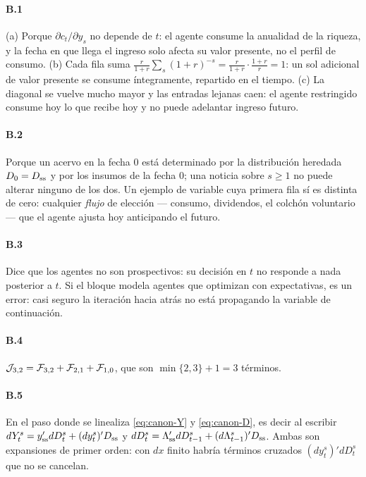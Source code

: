 \paragraph{B.1} (a) Porque $\partial c_t/\partial y_s$ no depende de $t$: el
agente consume la anualidad de la riqueza, y la fecha en que llega el ingreso solo
afecta su valor presente, no el perfil de consumo. (b) Cada fila suma
$\frac{r}{1+r}\sum_s (1+r)^{-s} = \frac{r}{1+r}\cdot\frac{1+r}{r} = 1$: un sol
adicional de valor presente se consume íntegramente, repartido en el tiempo.
(c) La diagonal se vuelve mucho mayor y las entradas lejanas caen: el agente
restringido consume hoy lo que recibe hoy y no puede adelantar ingreso futuro.

\paragraph{B.2} Porque un acervo en la fecha $0$ está determinado por la
distribución heredada $D_0=D_{\mathrm{ss}}$ y por los insumos de la fecha $0$; una noticia
sobre $s\ge1$ no puede alterar ninguno de los dos. Un ejemplo de variable cuya
primera fila sí es distinta de cero: cualquier \emph{flujo} de elección ---
consumo, dividendos, el colchón voluntario --- que el agente ajusta hoy
anticipando el futuro.

\paragraph{B.3} Dice que los agentes no son prospectivos: su decisión en $t$ no
responde a nada posterior a $t$. Si el bloque modela agentes que optimizan con
expectativas, es un error: casi seguro la iteración hacia atrás no está
propagando la variable de continuación.

\paragraph{B.4} $\mathcal{J}_{3,2} = \mathcal{F}_{3,2} + \mathcal{F}_{2,1} + \mathcal{F}_{1,0}$, que son
$\min\{2,3\}+1 = 3$ términos.

\paragraph{B.5} En el paso donde se linealiza \eqref{eq:canon-Y} y
\eqref{eq:canon-D}, es decir al escribir $dY^s_t = y_{\mathrm{ss}}'dD^s_t + (dy^s_t)'D_{\mathrm{ss}}$
y $dD^s_t = \Lambda_{\mathrm{ss}}' dD^s_{t-1} + (d\Lambda^s_{t-1})'D_{\mathrm{ss}}$. Ambas son
expansiones de primer orden: con $dx$ finito habría términos cruzados
$(dy^s_t)'dD^s_t$ que no se cancelan.

